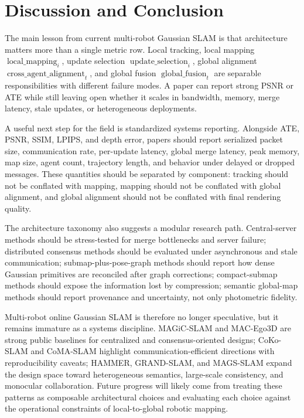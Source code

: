 \documentclass[11pt, a4paper, logo]{googledeepmind}
\begin{document}
\section{Discussion and Conclusion}

The main lesson from current multi-robot Gaussian SLAM is that architecture matters more than a single metric row. Local tracking, local mapping $\operatorname{local\_mapping}_i$, update selection $\operatorname{update\_selection}_i$, global alignment $\operatorname{cross\_agent\_alignment}_t$, and global fusion $\operatorname{global\_fusion}_t$ are separable responsibilities with different failure modes. A paper can report strong PSNR or ATE while still leaving open whether it scales in bandwidth, memory, merge latency, stale updates, or heterogeneous deployments.

A useful next step for the field is standardized systems reporting. Alongside ATE, PSNR, SSIM, LPIPS, and depth error, papers should report serialized packet size, communication rate, per-update latency, global merge latency, peak memory, map size, agent count, trajectory length, and behavior under delayed or dropped messages. These quantities should be separated by component: tracking should not be conflated with mapping, mapping should not be conflated with global alignment, and global alignment should not be conflated with final rendering quality.

The architecture taxonomy also suggests a modular research path. Central-server methods should be stress-tested for merge bottlenecks and server failure; distributed consensus methods should be evaluated under asynchronous and stale communication; submap-plus-pose-graph methods should report how dense Gaussian primitives are reconciled after graph corrections; compact-submap methods should expose the information lost by compression; semantic global-map methods should report provenance and uncertainty, not only photometric fidelity.

Multi-robot online Gaussian SLAM is therefore no longer speculative, but it remains immature as a systems discipline. MAGiC-SLAM and MAC-Ego3D are strong public baselines for centralized and consensus-oriented designs; CoKo-SLAM and CoMA-SLAM highlight communication-efficient directions with reproducibility caveats; HAMMER, GRAND-SLAM, and MAGS-SLAM expand the design space toward heterogeneous semantics, large-scale consistency, and monocular collaboration. Future progress will likely come from treating these patterns as composable architectural choices and evaluating each choice against the operational constraints of local-to-global robotic mapping.
\end{document}
